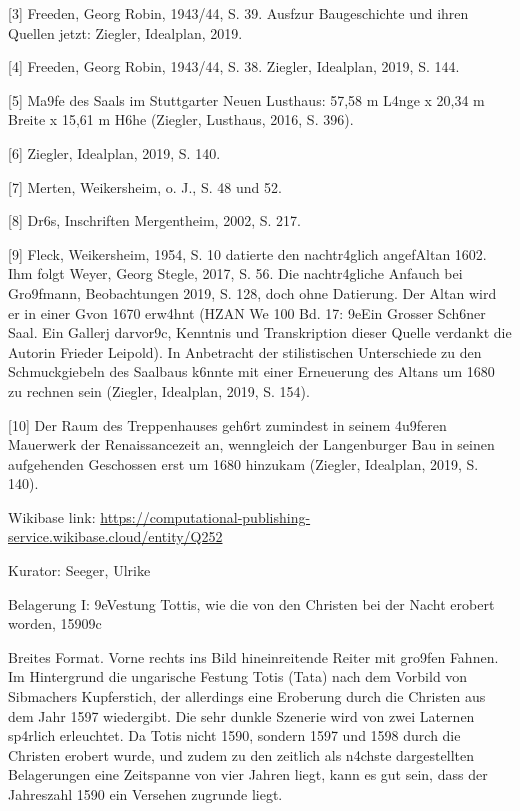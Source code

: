 \documentclass[
  letterpaper,
]{book}
\begin{document}
{[}3{]} Freeden, Georg Robin, 1943/44, S. 39. Ausf\xbchrlich zur
Baugeschichte und ihren Quellen jetzt: Ziegler, Idealplan, 2019.

{[}4{]} Freeden, Georg Robin, 1943/44, S. 38. Ziegler, Idealplan, 2019,
S. 144.

{[}5{]} Ma\x9fe des Saals im Stuttgarter Neuen Lusthaus: 57,58 m
L\xa4nge x 20,34 m Breite x 15,61 m H\xb6he (Ziegler, Lusthaus,
2016, S. 396).

{[}6{]} Ziegler, Idealplan, 2019, S. 140.

{[}7{]} Merten, Weikersheim, o. J., S. 48 und 52.

{[}8{]} Dr\xb6s, Inschriften Mergentheim, 2002, S. 217.

{[}9{]} Fleck, Weikersheim, 1954, S. 10 datierte den nachtr\xa4glich
angef\xbcgten Altan 1602. Ihm folgt Weyer, Georg Stegle, 2017, S.
56. Die nachtr\xa4gliche Anf\xbcgung auch bei Gro\x9fmann,
Beobachtungen 2019, S. 128, doch ohne Datierung. Der Altan wird er in
einer G\xbcterbeschreibung von 1670 erw\xa4hnt (HZAN We 100 Bd.
17: \x9eEin Grosser Sch\xb6ner Saal. Ein Gallerj
darvor\x9c, Kenntnis und Transkription dieser Quelle verdankt
die Autorin Frieder Leipold). In Anbetracht der stilistischen
Unterschiede zu den Schmuckgiebeln des Saalbaus k\xb6nnte mit einer
Erneuerung des Altans um 1680 zu rechnen sein (Ziegler, Idealplan, 2019,
S. 154).

{[}10{]} Der Raum des Treppenhauses geh\xb6rt zumindest in seinem
\xa4u\x9feren Mauerwerk der Renaissancezeit an, wenngleich der
Langenburger Bau in seinen aufgehenden Geschossen erst um 1680 hinzukam
(Ziegler, Idealplan, 2019, S. 140).

Wikibase link:
\url{https://computational-publishing-service.wikibase.cloud/entity/Q252}

Kurator: Seeger, Ulrike

Belagerung I: \x9eVestung Tottis, wie die von den Christen bei
der Nacht erobert worden, 1590\x9c

Breites Format. Vorne rechts ins Bild hineinreitende Reiter mit
gro\x9fen Fahnen. Im Hintergrund die ungarische Festung Totis (Tata)
nach dem Vorbild von Sibmachers Kupferstich, der allerdings eine
Eroberung durch die Christen aus dem Jahr 1597 wiedergibt. Die sehr
dunkle Szenerie wird von zwei Laternen sp\xa4rlich erleuchtet. Da
Totis nicht 1590, sondern 1597 und 1598 durch die Christen erobert
wurde, und zudem zu den zeitlich als n\xa4chste dargestellten
Belagerungen eine Zeitspanne von vier Jahren liegt, kann es gut sein,
dass der Jahreszahl 1590 ein Versehen zugrunde liegt.
\end{document}
